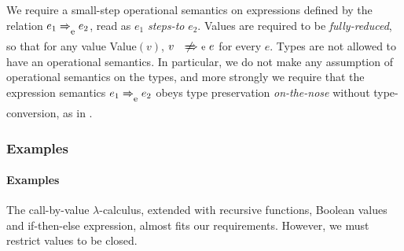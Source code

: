 We require a small-step operational semantics on expressions defined by the relation $e_1 \localstep{} e_2$, read as $e_1$ \emph{steps-to} $e_2$.
Values are required to be \emph{fully-reduced}, so that for any value Value$(v)$, $v \nlocalstep{} e$ for every $e$.
Types are not allowed to have an operational semantics.
In particular, we do not make any assumption of operational semantics on the types, and more strongly we require that the expression semantics $e_1 \localstep{} e_2$ obeys type preservation \emph{on-the-nose} without type-conversion, as in \todo.

\iftr\subsubsection{Examples}\else\paragraph{Examples}\fi
\label{sec:loc-lang-examples}

\begin{ex}
  \label{ex:cbv-lambda}
 The call-by-value $\lambda$-calculus, extended with recursive functions, Boolean values and if-then-else expression, almost fits our requirements.
  However, we must restrict values to be closed.
\end{ex}

